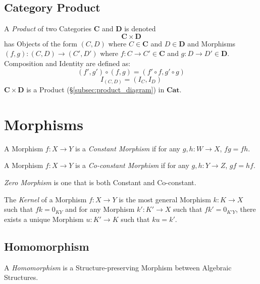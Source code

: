 \documentclass{article}
\begin{document}
\subsection{Category Product}\label{subsec:category_product}

A \emph{Product} of two Categories $\mathbf{C}$ and $\mathbf{D}$ is
denoted
\[
    \mathbf{C} \times \mathbf{D}
\]
has Objects of the form $(C,D)$ where $C \in \mathbf{C}$ and $D \in
\mathbf{D}$ and Morphisms $(f,g) : (C,D) \rightarrow (C',D')$ where $f
: C \rightarrow C' \in \mathbf{C}$ and $g : D \rightarrow D' \in
\mathbf{D}$. Composition and Identity are defined as:
\[
    (f',g') \circ (f,g) = (f' \circ f,g' \circ g)
\]\[
    I_{(C,D)} = (I_C, I_D)
\]
$\mathbf{C} \times \mathbf{D}$ is a Product
(\S\ref{subsec:product_diagram}) in $\mathbf{Cat}$.

\section{Morphisms}\label{sec:category_morphisms}

A Morphism $f : X \rightarrow Y$ is a \emph{Constant Morphism} if for
any $g, h : W \rightarrow X$, $fg = fh$.

A Morphism $f : X \rightarrow Y$ is a \emph{Co-constant Morphism} if
for any $g, h : Y \rightarrow Z$, $gf = hf$.

\emph{Zero Morphism} is one that is both Constant and Co-constant.

The \emph{Kernel} of a Morphism $f : X \rightarrow Y$ is the most
general Morphism $k : K \rightarrow X$ such that $fk = 0_{KY}$ and for
any Morphism $k' : K' \rightarrow X$ such that $fk' = 0_{K'Y}$, there
exists a unique Morphism $u : K' \rightarrow K$ such that $ku = k'$.

\subsection{Homomorphism}\label{subsec:homomorphism}

A \emph{Homomorphism} is a Structure-preserving Morphism between
Algebraic Structures.
\end{document}
